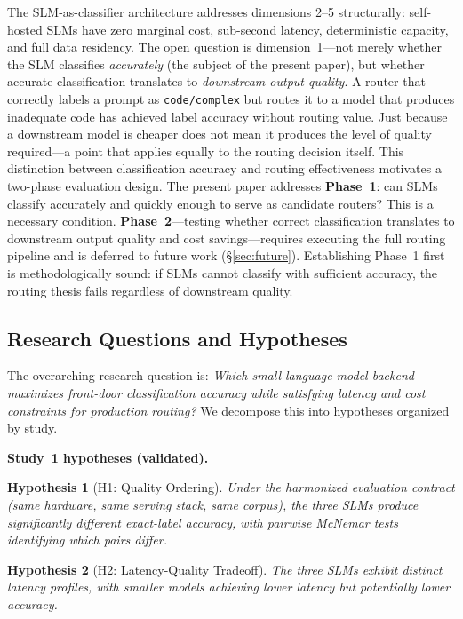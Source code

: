 \documentclass{article}
\newtheorem{hypothesis}{Hypothesis}
\begin{document}
The SLM-as-classifier architecture addresses dimensions 2--5 structurally: self-hosted SLMs have zero marginal cost, sub-second latency, deterministic capacity, and full data residency. The open question is dimension~1---not merely whether the SLM classifies \emph{accurately} (the subject of the present paper), but whether accurate classification translates to \emph{downstream output quality}. A router that correctly labels a prompt as \texttt{code/complex} but routes it to a model that produces inadequate code has achieved label accuracy without routing value. Just because a downstream model is cheaper does not mean it produces the level of quality required---a point that applies equally to the routing decision itself. This distinction between classification accuracy and routing effectiveness motivates a two-phase evaluation design. The present paper addresses \textbf{Phase~1}: can SLMs classify accurately and quickly enough to serve as candidate routers? This is a necessary condition. \textbf{Phase~2}---testing whether correct classification translates to downstream output quality and cost savings---requires executing the full routing pipeline and is deferred to future work (\S\ref{sec:future}). Establishing Phase~1 first is methodologically sound: if SLMs cannot classify with sufficient accuracy, the routing thesis fails regardless of downstream quality.

\subsection{Research Questions and Hypotheses}
\label{sec:hypotheses}

The overarching research question is: \emph{Which small language model backend maximizes front-door classification accuracy while satisfying latency and cost constraints for production routing?} We decompose this into hypotheses organized by study.

\textbf{Study~1 hypotheses (validated).}

\begin{hypothesis}[H1: Quality Ordering]
\label{hyp:quality}
\emph{Under the harmonized evaluation contract (same hardware, same serving stack, same corpus), the three SLMs produce significantly different exact-label accuracy, with pairwise McNemar tests identifying which pairs differ.}
\end{hypothesis}

\begin{hypothesis}[H2: Latency-Quality Tradeoff]
\label{hyp:latency-s1}
\emph{The three SLMs exhibit distinct latency profiles, with smaller models achieving lower latency but potentially lower accuracy.}
\end{hypothesis}
\end{document}
